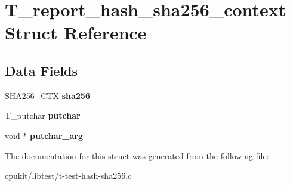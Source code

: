 \hypertarget{structT__report__hash__sha256__context}{}\section{T\+\_\+report\+\_\+hash\+\_\+sha256\+\_\+context Struct Reference}
\label{structT__report__hash__sha256__context}
\subsection*{Data Fields}
\begin{DoxyCompactItemize}
\item 
\mbox{\label{structT__report__hash__sha256__context_a6a51990513d2f1a9159237d3054f7c28}} 
\mbox{\hyperlink{structSHA256Context}{S\+H\+A256\+\_\+\+C\+TX}} {\bfseries sha256}
\item 
\mbox{\label{structT__report__hash__sha256__context_a079351fdf69f47125c404eaf98dec559}} 
T\+\_\+putchar {\bfseries putchar}
\item 
\mbox{\label{structT__report__hash__sha256__context_aaa6a117ef1681c0b76054b5a5f99d66a}} 
void $\ast$ {\bfseries putchar\+\_\+arg}
\end{DoxyCompactItemize}


The documentation for this struct was generated from the following file\+:\begin{DoxyCompactItemize}
\item 
cpukit/libtest/t-\/test-\/hash-\/sha256.\+c\end{DoxyCompactItemize}
